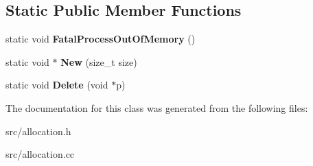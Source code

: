 \subsection*{Static Public Member Functions}
\begin{DoxyCompactItemize}
\item 
\hypertarget{classv8_1_1internal_1_1_malloced_a3406aab329b144291d4177d52c0f62be}{}static void {\bfseries Fatal\+Process\+Out\+Of\+Memory} ()\label{classv8_1_1internal_1_1_malloced_a3406aab329b144291d4177d52c0f62be}

\item 
\hypertarget{classv8_1_1internal_1_1_malloced_a20e13f78edcc04c7bb514c0659dc49fa}{}static void $\ast$ {\bfseries New} (size\+\_\+t size)\label{classv8_1_1internal_1_1_malloced_a20e13f78edcc04c7bb514c0659dc49fa}

\item 
\hypertarget{classv8_1_1internal_1_1_malloced_ace0f2f3fe0407b68f037360431dfc30a}{}static void {\bfseries Delete} (void $\ast$p)\label{classv8_1_1internal_1_1_malloced_ace0f2f3fe0407b68f037360431dfc30a}

\end{DoxyCompactItemize}


The documentation for this class was generated from the following files\+:\begin{DoxyCompactItemize}
\item 
src/allocation.\+h\item 
src/allocation.\+cc\end{DoxyCompactItemize}
